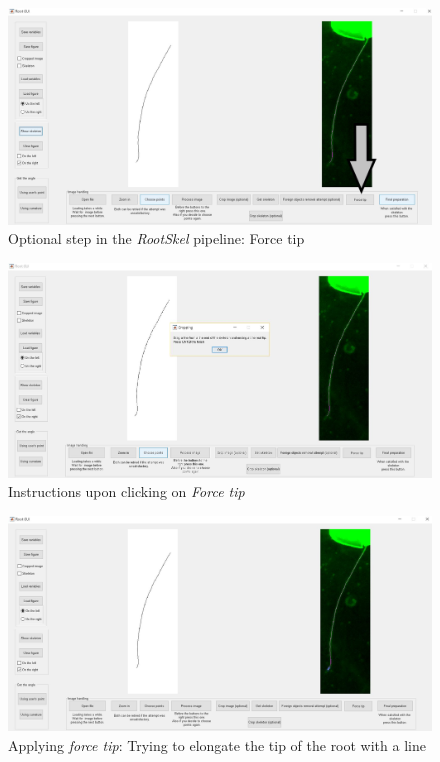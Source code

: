 \begin{figure}[H]
	\centering
	\includegraphics[width=\textwidth]{../Figures/manual/optionalB1.jpg}
	\caption{Optional step in the \textit{RootSkel} pipeline: Force tip}
	\label{fig:img37}
\end{figure}

\begin{figure}[H]
	\centering
	\includegraphics[width=\textwidth]{../Figures/manual/optionalB2.jpg}
	\caption{Instructions upon clicking on \textit{Force tip}}
	\label{fig:img38}
\end{figure}

\begin{figure}[H]
	\centering
	\includegraphics[width=\textwidth]{../Figures/manual/optionalB3.jpg}
	\caption{Applying \textit{force tip}: Trying to elongate the tip of the root with a line}
	\label{fig:img39}
\end{figure}

